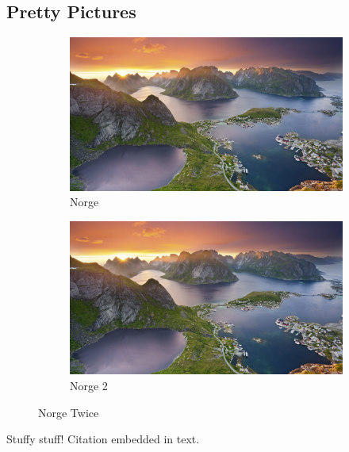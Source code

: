 \documentclass{article}
\begin{document}
\subsection{Pretty Pictures}
\begin{figure}[b!]
	\centering
	\begin{subfigure}[b]{0.3\linewidth}
		\centering
		\includegraphics[width=\linewidth]{imgs/Norge1.jpg}
		\caption{Norge}
	\end{subfigure}
	\begin{subfigure}[b]{0.3\linewidth}
		\centering
		\includegraphics[width=\linewidth]{imgs/Norge1.jpg}
		\caption{Norge 2}
	\end{subfigure}
	\caption{Norge Twice}
	\label{fig:norge}
\end{figure}
Stuffy stuff!
Citation\cite{DUMMY:1} embedded in text.
\end{document}
